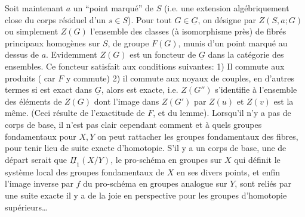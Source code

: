 Soit maintenant $a$ un ``point marqué'' de $S$ (i.e. une extension algébriquement close du corps résiduel d'un $s\in S$). Pour tout $G\in\underline G$, on désigne par $Z(S,a;G)$ ou simplement $Z(G)$ l'ensemble des classes (à isomorphisme près) de fibrés principaux homogènes sur $S$, de groupe $F(G)$, munis d'un point marqué au dessus de $a$. Evidemment $Z(G)$ est un foncteur de $\underline G$ dans la catégorie des ensembles. Ce foncteur satisfait aux conditions suivantes: 1) Il commute aux produits ( car $F$ y commute) 2) il commute aux noyaux de couples, en d'autres termes si
est exact dans $\underline G$, alors
est exacte, i.e. $Z(G'')$ s'identifie à l'ensemble des éléments de $Z(G)$ dont l'image dans $Z(G')$ par $Z(u)$ et $Z(v)$ est la même. (Ceci résulte de l'exactitude de $F$, et du lemme).
Lorsqu'il n'y a pas de corps de base, il n'est pas clair cependant comment et à quels groupes fondamentaux  pour $X,Y$ on peut rattacher  les groupes fondamentaux des fibres, pour tenir lieu de suite exacte d'homotopie. S'il y a un corps de base, une   de départ serait que  $\underline\Pi_1(X/Y)$, le pro-schéma en groupes  sur $X$ qui définit le système local des groupes fondamentaux  de $X$ en ses divers points, et enfin l'image inverse par $f$ du pro-schéma en groupes analogue  sur $Y$, sont reliés par une suite exacte  il y a de la joie en perspective pour les groupes d'homotopie supérieurs\ldots

